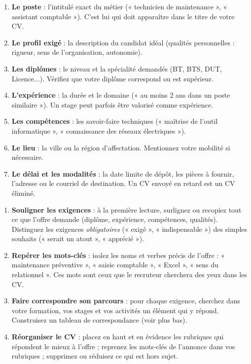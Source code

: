 \documentclass[11pt]{article}
\begin{document}
\begin{enumerate}
\item \textbf{Le poste} : l'intitulé exact du métier (« technicien de maintenance », « assistant comptable »). C'est lui qui doit apparaître dans le titre de votre CV.
\item \textbf{Le profil exigé} : la description du candidat idéal (qualités personnelles : rigueur, sens de l'organisation, autonomie).
\item \textbf{Les diplômes} : le niveau et la spécialité demandés (BT, BTS, DUT, Licence...). Vérifiez que votre diplôme correspond ou est supérieur.
\item \textbf{L'expérience} : la durée et le domaine (« au moins 2 ans dans un poste similaire »). Un stage peut parfois être valorisé comme expérience.
\item \textbf{Les compétences} : les savoir-faire techniques (« maîtrise de l'outil informatique », « connaissance des réseaux électriques »).
\item \textbf{Le lieu} : la ville ou la région d'affectation. Mentionnez votre mobilité si nécessaire.
\item \textbf{Le délai et les modalités} : la date limite de dépôt, les pièces à fournir, l'adresse ou le courriel de destination. Un CV envoyé en retard est un CV éliminé.
\end{enumerate}

\begin{methode}
\begin{enumerate}
\item \textbf{Souligner les exigences} : à la première lecture, surlignez ou recopiez tout ce que l'offre demande (diplôme, expérience, compétences, qualités). Distinguez les exigences \emph{obligatoires} (« exigé », « indispensable ») des simples souhaits (« serait un atout », « apprécié »).
\item \textbf{Repérer les mots-clés} : isolez les noms et verbes précis de l'offre : « maintenance préventive », « saisie comptable », « Excel », « sens du relationnel ». Ces mots sont ceux que le recruteur cherchera des yeux dans les CV.
\item \textbf{Faire correspondre son parcours} : pour chaque exigence, cherchez dans votre formation, vos stages et vos activités un élément qui y répond. Construisez un tableau de correspondance (voir plus bas).
\item \textbf{Réorganiser le CV} : placez en haut et en évidence les rubriques qui répondent le mieux à l'offre ; reprenez les mots-clés de l'annonce dans vos rubriques ; supprimez ou réduisez ce qui est hors sujet.
\end{enumerate}
\end{methode}
\end{document}

